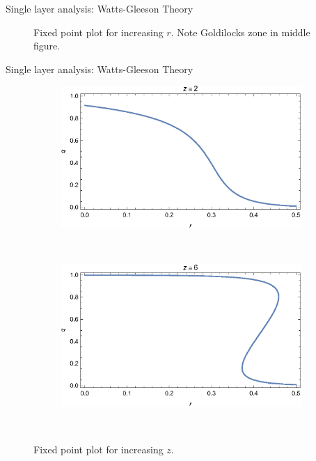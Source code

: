 \documentclass[10pt, xcolor=dvipsnames, handout]{beamer}
\begin{document}
\begin{frame}{Single layer analysis: Watts-Gleeson Theory}
\begin{figure}
\begin{subfigure}[b]{0.4\textwidth}
    \end{subfigure}
    \caption{Fixed point plot for increasing $r$. Note Goldilocks zone in middle figure.}
\end{figure}
\end{frame}

\begin{frame}{Single layer analysis: Watts-Gleeson Theory}
\begin{figure}
    \centering
    \begin{subfigure}[b]{0.4\textwidth}
        \includegraphics[width=\textwidth]{figures/one_layer_qr_z2}
    \end{subfigure}
    ~ %
    \begin{subfigure}[b]{0.4\textwidth}
        \includegraphics[width=\textwidth]{figures/one_layer_qr_z6}
    \end{subfigure}
    ~ %
    \caption{Fixed point plot for increasing $z$.}
\end{figure}
\end{frame}
\end{document}
